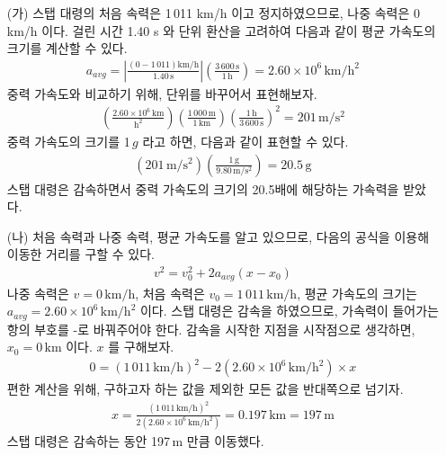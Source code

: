 \documentclass[APS,floatfix,nofootinbib,superscriptaddress,fleqn,preprint]{revtex4}
\begin{document}
\begin{itemize}
  \item [(가)] 스탭 대령의 처음 속력은 1\,011 km/h 이고 정지하였으므로, 나중 속력은 0 km/h 이다. 걸린 시간 1.40 s 와 단위 환산을 고려하여 다음과 같이 평균 가속도의 크기를 계산할 수 있다.
  \begin{align}
    a_{avg} = \left|\frac{(0-1\,011)\mathrm{km/h}}{1.40 \,\mathrm{s}}\right|\left(\frac{3\,600\,\mathrm{s}}{1\,\mathrm{h}}\right)=2.60\times 10^6\,\mathrm{km/h^2}
  \end{align} 
  중력 가속도와 비교하기 위해, 단위를 바꾸어서 표현해보자.
  \begin{align}
    \left(\mathrm{\frac{2.60\times 10^6\,km}{h^2}}\right)\left(\mathrm{\frac{1\,000\,m}{1\,km}}\right)\mathrm{\left(\frac{1\,h}{3\,600\,s}\right)^2}=201\,\mathrm{m/s^2}
  \end{align}
  중력 가속도의 크기를 1\,$g$ 라고 하면, 다음과 같이 표현할 수 있다.
  \begin{align}
  \left(\mathrm{201\,m/s^2}\right)\left(\frac{1\,\mathrm{g}}{9.80\,\mathrm{m/s^2}}\right) = 20.5\,\mathrm{g}
  \end{align} 
  스탭 대령은 감속하면서 중력 가속도의 크기의 20.5배에 해당하는 가속력을 받았다.
  \item [(나)] 처음 속력과 나중 속력, 평균 가속도를 알고 있으므로, 다음의 공식을 이용해 이동한 거리를 구할 수 있다.
  \begin{align}
    v^2=v_0^2+2a_{avg}(x-x_0)
  \end{align}
  나중 속력은 $v=\mathrm{0\,km/h}$, 처음 속력은 $v_0=\mathrm{1\,011\,km/h}$, 평균 가속도의 크기는 $a_{avg}=2.60\times 10^6\,\mathrm{km/h^2}$ 이다. 스탭 대령은 감속을 하였으므로, 가속력이 들어가는 항의 부호를 -로 바꿔주어야 한다. 감속을 시작한 지점을 시작점으로 생각하면, $x_0=0\,\mathrm{km}$ 이다. $x$ 를 구해보자.
  \begin{align}
    0=\left(\mathrm{1\,011\,km/h}\right)^2-2\left(2.60\times 10^6\,\mathrm{km/h^2}\right)\times x
  \end{align}    
  편한 계산을 위해, 구하고자 하는 값을 제외한 모든 값을 반대쪽으로 넘기자.
  \begin{align}    
    x=\frac{\left(\mathrm{1\,011\,km/h}\right)^2}{2\left(2.60\times 10^6\,\mathrm{km/h^2}\right)}=0.197\,\mathrm{km}=197\,\mathrm{m}
  \end{align}
  스탭 대령은 감속하는 동안 197\,m 만큼 이동했다.
\end{itemize}

\newpage
\end{document}
